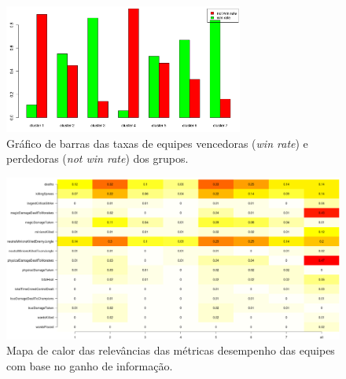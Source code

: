 \begin{figure}
  \centering
  \includegraphics[width=0.7\textwidth]{win-rate-plot}%
  \caption{Gráfico de barras das taxas de equipes vencedoras (\textit{win rate}) e perdedoras (\textit{not win rate}) dos grupos.}
  \label{fig:win-plot}
\end{figure}

\begin{figure}
\includegraphics[width=1\textwidth,height=\textheight,keepaspectratio]{relevance}
\caption{Mapa de calor das relevâncias das métricas desempenho das equipes com base no ganho de informação.}
\label{fig:relevance}
\end{figure}

